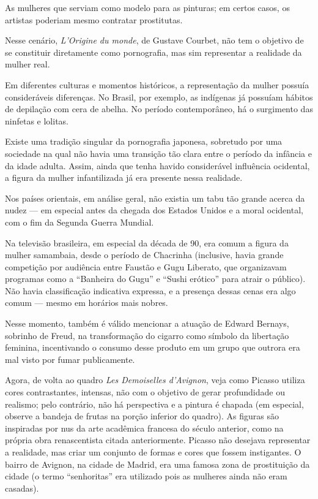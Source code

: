 As mulheres que serviam como modelo para as pinturas; em certos casos, os artistas poderiam mesmo contratar prostitutas.

Nesse cenário, \textit{L'Origine du monde}, de Gustave Courbet, não tem o objetivo de se constituir diretamente como pornografia, mas sim representar a realidade da mulher real.

Em diferentes culturas e momentos históricos, a representação da mulher possuía consideráveis diferenças. No Brasil, por exemplo, as indígenas já possuíam hábitos de depilação com cera de abelha. No período contemporâneo, há o surgimento das ninfetas e lolitas.

Existe uma tradição singular da pornografia japonesa, sobretudo por uma sociedade na qual não havia uma transição tão clara entre o período da infância e da idade adulta. Assim, ainda que tenha havido considerável influência ocidental, a figura da mulher infantilizada já era presente nessa realidade.

Nos países orientais, em análise geral, não existia um tabu tão grande acerca da nudez — em especial antes da chegada dos Estados Unidos e a moral ocidental, com o fim da Segunda Guerra Mundial.

Na televisão brasileira, em especial da década de 90, era comum a figura da mulher samambaia, desde o período de Chacrinha (inclusive, havia grande competição por audiência entre Faustão e Gugu Liberato, que organizavam programas como a ``Banheira do Gugu'' e ``Sushi erótico'' para atrair o público). Não havia classificação indicativa expressa, e a presença dessas cenas era algo comum — mesmo em horários mais nobres.

Nesse momento, também é válido mencionar a atuação de Edward Bernays, sobrinho de Freud, na transformação do cigarro como símbolo da libertação feminina, incentivando o consumo desse produto em um grupo que outrora era mal visto por fumar publicamente.

Agora, de volta ao quadro \textit{Les Demoiselles d'Avignon}, veja como Picasso utiliza cores contrastantes, intensas, não com o objetivo de gerar profundidade ou realismo; pelo contrário, não há perspectiva e a pintura é chapada (em especial, observe a bandeja de frutas na porção inferior do quadro). As figuras são inspiradas por nus da arte acadêmica francesa do século anterior, como na própria obra renascentista citada anteriormente. Picasso não desejava representar a realidade, mas criar um conjunto de formas e cores que fossem instigantes. O bairro de Avignon, na cidade de Madrid, era uma famosa zona de prostituição da cidade (o termo ``senhoritas'' era utilizado pois as mulheres ainda não eram casadas).

